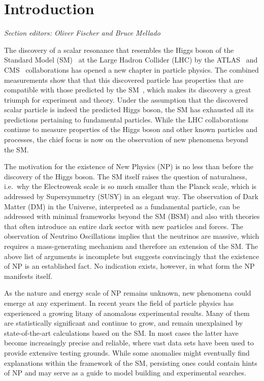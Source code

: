 \documentclass[10pt]{article}
\begin{document}
\newpage

\tableofcontents


\section{Introduction} 
%
{\it\small Section editors: Oliver Fischer and Bruce Mellado}

\medskip\noindent
The discovery of a scalar resonance that resembles the Higgs boson of the Standard Model (SM)~\cite{Higgs:1964ia,Englert:1964et,Higgs:1964pj,Guralnik:1964eu} at the Large Hadron Collider (LHC) by the
ATLAS~\cite{Aad:2012tfa} and CMS~\cite{Chatrchyan:2012ufa} collaborations has opened a new chapter in particle physics. 
%
The combined measurements show that that this discovered particle has properties that are compatible with those predicted by the SM~\cite{ATLAS:2016neq}, which makes its discovery a great triumph for experiment and theory.
%
Under the assumption that the discovered scalar particle is indeed the predicted Higgs boson, the SM has exhausted all its predictions pertaining to fundamental particles.
While the LHC collaborations continue to measure properties of the Higgs boson and other known particles and processes, the chief focus is now on the observation of new phenomena beyond the SM. 

The motivation for the existence of New Physics (NP) is no less than before the discovery of the Higgs boson.
The SM itself raises the question of naturalness, i.e.\ why the Electroweak scale is so much smaller than the Planck scale, which is addressed by Supersymmetry (SUSY) in an elegant way.
The observation of Dark Matter (DM) in the Universe, interpreted as a fundamental particle, can be addressed with minimal frameworks beyond the SM (BSM) and also with theories that often introduce an entire dark sector with new particles and forces. 
The observation of Neutrino Oscillations implies that the neutrinos are massive, which requires a mass-generating mechanism and therefore an extension of the SM. 
The above list of arguments is incomplete but suggests convincingly that the existence of NP is an established fact. 
No indication exists, however, in what form the NP manifests itself.

As the nature and energy scale of NP remains unknown, new phenomena could emerge at any experiment.
In recent years the field of particle physics has experienced a growing litany of anomalous experimental results. 
Many of them are statistically significant and continue to grow, and remain unexplained by state-of-the-art calculations based on the SM. 
In most cases the latter have become increasingly precise and reliable, where vast data sets have been used to provide extensive testing grounds. 
While some anomalies might eventually find explanations within the framework of the SM, persisting ones could contain hints of NP and may serve as a guide to model building and experimental searches.
\end{document}
